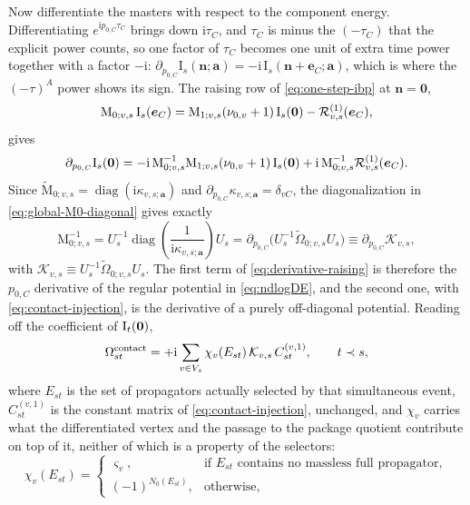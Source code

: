 \documentclass[11pt,a4paper]{article}
\newcommand{\ii}{\mathrm i}
\newcommand{\diag}{\operatorname{diag}}
\newcommand{\cR}{\mathcal R}
\begin{document}
Now differentiate the masters with respect to the component energy. Differentiating
$e^{\ii p_{0,C}\tau_C}$ brings down $\ii\tau_C$, and $\tau_C$ is minus the $(-\tau_C)$ that the
explicit power counts, so one factor of $\tau_C$ becomes one unit of extra time power together with
a factor $-\ii$:
$\partial_{p_{0,C}}\text{I}_s(\bm n;\bm a)=-\ii\,\text{I}_s(\bm n+\bm e_C;\bm a)$, which is where the
$(-\tau)^A$ power shows its sign. The raising row of \eqref{eq:one-step-ibp} at $\bm n=\bm 0$,
\begin{equation}
  \text{M}_{0;v,s}\,\bm{\text I}_s(\bm e_C)
  =\text{M}_{1;v,s}(\nu_{0,v}+1)\,\bm{\text I}_s(\bm 0)-\cR^{(1)}_{v,s}(\bm e_C),
  \label{eq:raising-row}
\end{equation}
gives
\begin{equation}
  \partial_{p_{0,C}}\bm{\text I}_s(\bm 0)
  =-\ii\,\text{M}_{0;v,s}^{-1}\text{M}_{1;v,s}(\nu_{0,v}+1)\,\bm{\text I}_s(\bm 0)
  +\ii\,\text{M}_{0;v,s}^{-1}\cR^{(1)}_{v,s}(\bm e_C).
  \label{eq:derivative-raising}
\end{equation}
Since $\widetilde{\text{M}}_{0;v,s}=\diag(\ii\kappa_{v,s;\bm a})$ and
$\partial_{p_{0,C}}\kappa_{v,s;\bm a}=\delta_{vC}$, the diagonalization in
\eqref{eq:global-M0-diagonal} gives exactly
\begin{equation}
  \text{M}_{0;v,s}^{-1}
  =U_s^{-1}\diag\!\left(\frac{1}{\ii\kappa_{v,s;\bm a}}\right)U_s
  =\partial_{p_{0,C}}\big(U_s^{-1}\widetilde\Omega_{0;v,s}U_s\big)
  \equiv \partial_{p_{0,C}}\mathcal K_{v,s},
  \label{eq:M0-inverse-derivative}
\end{equation}
with $\mathcal K_{v,s}\equiv U_s^{-1}\widetilde\Omega_{0;v,s}U_s$. The first term of
\eqref{eq:derivative-raising} is therefore the $p_{0,C}$ derivative of the regular potential in
\eqref{eq:ndlogDE}, and the second one, with \eqref{eq:contact-injection}, is the derivative of a
purely off-diagonal potential. Reading off the coefficient of $\bm{\text I}_t(\bm 0)$,
\begin{equation}
  \Omega^{\rm contact}_{st}
  =+\ii\sum_{v\in V_s}\chi_v(E_{st})\,\mathcal K_{v,s}\,C^{(v,1)}_{st},
  \qquad t\prec s,
  \label{eq:contact-omega}
\end{equation}
where $E_{st}$ is the set of propagators actually selected by that simultaneous event,
$C^{(v,1)}_{st}$ is the constant matrix of \eqref{eq:contact-injection}, unchanged, and $\chi_v$
carries what the differentiated vertex and the passage to the package quotient contribute on top of
it, neither of which is a property of the selectors:
\begin{equation}
  \chi_v(E_{st})=\begin{cases}
  \varsigma_v,&\text{if }E_{st}\text{ contains no massless full propagator},\\
  (-1)^{N_0(E_{st})},&\text{otherwise},
  \end{cases}
  \label{eq:contact-phase}
\end{equation}
\end{document}
